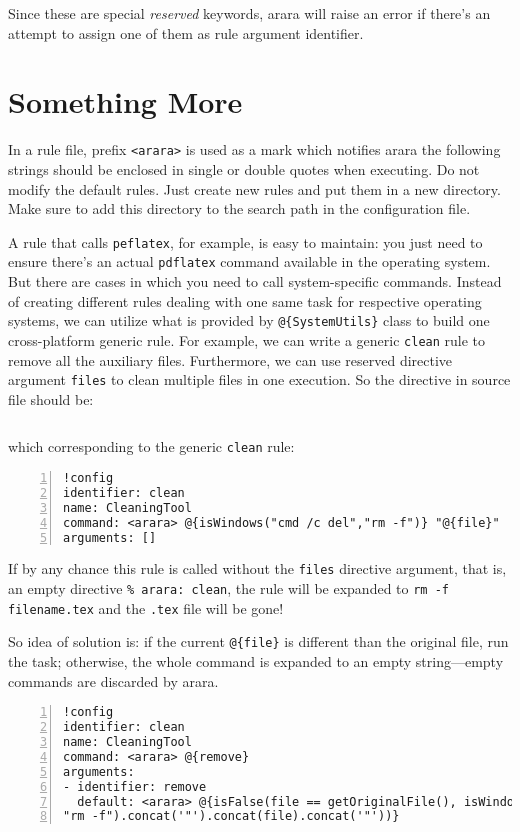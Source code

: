 \documentclass[a4paper]{article}
\begin{document}
Since these are special \emph{reserved} keywords, arara will raise an error if there's an attempt to assign one of them as rule argument identifier.

\part{Something More}
In a rule file, prefix \verb|<arara>| is used as a mark which notifies arara the following strings should be enclosed in single or double quotes when executing.
Do not modify the default rules. Just create new rules and put them in a new directory. Make sure to add this directory to the search path in the configuration file.

A rule that calls \verb|peflatex|, for example, is easy to maintain: you just need to ensure there's an actual \verb|pdflatex| command available in the operating system. But there are cases in which you need to call system-specific commands.
Instead of creating different rules dealing with one same task for respective operating systems, we can utilize what is provided by \verb|@{SystemUtils}| class to build one cross-platform generic rule.
For example, we can write a generic \verb|clean| rule to remove all the auxiliary files. Furthermore, we can use reserved directive argument \verb|files| to clean multiple files in one execution. So the directive in source file should be:
\begin{lstlisting}[mathescape=true]
% arara: clean: {files: [filename.aux,filename.log,$\dots$]}
\end{lstlisting}
which corresponding to the generic \verb|clean| rule:
\begin{lstlisting}[basicstyle=\ttfamily,numbers=left]
!config
identifier: clean
name: CleaningTool
command: <arara> @{isWindows("cmd /c del","rm -f")} "@{file}"
arguments: []
\end{lstlisting}
If by any chance this rule is called without the \verb|files| directive argument, that is, an empty directive \verb|% arara: clean|, the rule will be expanded to \verb|rm -f filename.tex| and the \verb|.tex| file will be gone!

So idea of solution is: if the current \verb|@{file}| is different than the original file, run the task; otherwise, the whole command is expanded to an empty string---empty commands are discarded by arara.
\begin{lstlisting}[basicstyle=\ttfamily,numbers=left]
!config
identifier: clean
name: CleaningTool
command: <arara> @{remove}
arguments:
- identifier: remove
  default: <arara> @{isFalse(file == getOriginalFile(), isWindows("cmd /c del",
"rm -f").concat('"').concat(file).concat('"'))}
\end{lstlisting}
\end{document}
